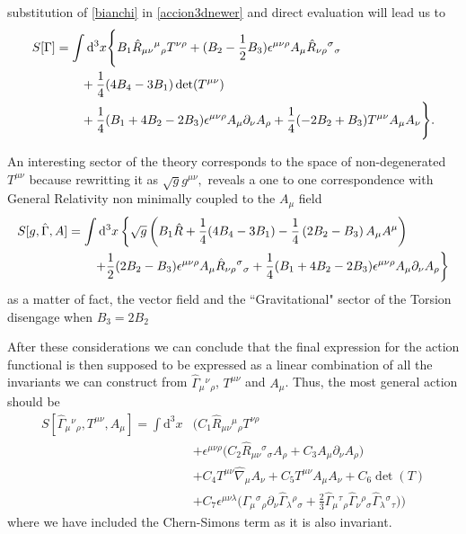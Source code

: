 \documentclass[%
  showpacs,showkeys,prd,superscriptaddress]{revtex4-1}
\def\md{{\mathrm{d}}}
\def\l{\left}
\def\r{\right}
\begin{document}
substitution of \eqref{bianchi} in \eqref{accion3dnewer} and direct evaluation will lead us to
\begin{align}
  \label{accion3dfinal}
  S[\Gamma]&=\int\md^3x \Bigg\{B_1\hat R_{\mu\nu}{}^\mu{}_{\rho} T^{\nu\rho}+(B_2-\frac{1}{2}B_3)\epsilon^{\mu\nu\rho}A_\mu\hat R_{\nu\rho}{}^{\sigma}{}_\sigma \nonumber\\
  & \qquad + \frac{1}{4}(4B_4-3B_1) \det(T^{\mu\nu})\\
  & \qquad + \frac{1}{4}(B_1+4B_2-2B_3)\epsilon^{\mu\nu\rho}A_\mu\partial_\nu A_\rho+\frac{1}{4}(-2B_2+B_3)T^{\mu\nu}A_\mu A_\nu\Bigg\}.\notag
\end{align}

An interesting sector of the theory corresponds to the space of non-degenerated $T^{\mu\nu}$ because rewritting it as $\sqrt{g}g^{\mu\nu},$ reveals a one to one correspondence with General Relativity non minimally coupled to the $A_\mu$ field
\begin{align}
  \label{accion3dGR}
  S[g,\hat\Gamma,A]&=
  \int\md^3x \l\{\sqrt{g}\l(B_1\hat R +\frac{1}{4}(4B_4-3B_1) -\frac{1}{4}\l( 2B_2-B_3\r) A_\mu A^\mu\r)\r.\\
  & \qquad \l.+\frac{1}{2}(2B_2-B_3)\epsilon^{\mu\nu\rho}A_\mu\hat R_{\nu\rho}{}^{\sigma}{}_\sigma+\frac{1}{4}(B_1+4B_2-2B_3)\epsilon^{\mu\nu\rho}A_\mu\partial_\nu A_\rho\r\}\notag
\end{align}
as a matter of fact, the vector field and the ``Gravitational" sector of the Torsion disengage when $B_3=2B_2$

After these considerations we can conclude that the final expression for the action functional is then supposed to be expressed as a linear combination of all the invariants we can construct from $\hat\Gamma_{\mu}{}^{\nu}{}_\rho$, $T^{\mu\nu}$ and $A_\mu$. Thus, the most general action should be 
\begin{equation}
  \begin{split}
    S[\hat\Gamma_{\mu}{}^{\nu}{}_\rho,T^{\mu\nu},A_\mu] = \int \md^3x & \bigg(
    C_1\hat R_{\mu\nu}{}^{\mu}{}_\rho T^{\nu\rho}\\
    & + \epsilon^{\mu\nu\rho}\big(C_2\hat R_{\mu\nu}{}^{\sigma}{}_\sigma A_\rho
    + C_3A_\mu\partial_\nu A_\rho\big)\\%
    & + C_4T^{\mu\nu}\hat\nabla_\mu A_\nu
    + C_5T^{\mu\nu}A_\mu A_\nu
    + C_6\det(T)\\%
    & + C_7\epsilon^{\mu\nu\lambda}\big(\hat\Gamma_{\mu}{}^{\sigma}{}_\rho\partial_\nu\hat\Gamma_{\lambda}{}^{\rho}{}_\sigma+\frac{2}{3}\hat\Gamma_{\mu}{}^{\tau}{}_\rho\hat\Gamma_{\nu}{}^{\rho}{}_\sigma\hat\Gamma_{\lambda}{}^{\sigma}{}_\tau\big)
    \bigg)
  \end{split}
\end{equation}
where we have included the Chern-Simons term as it is also invariant.
\end{document}
